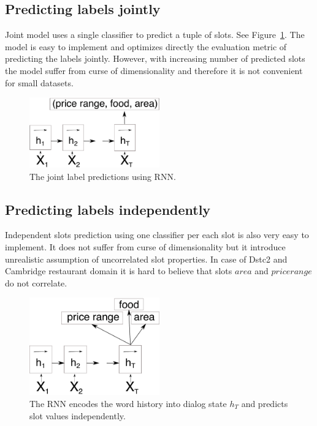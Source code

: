 \documentclass{itatnew}
\begin{document}
\subsection{Predicting labels jointly}
\label{sec:joint}
Joint model uses a single classifier to predict a tuple of slots. 
See Figure~\ref{fig:encjoint}.
The model is easy to implement and optimizes directly the evaluation metric of predicting the labels jointly.
However, with increasing number of predicted slots the model suffer from curse of dimensionality and therefore it is not convenient for small datasets.
\begin{figure}
\includegraphics[width=0.5\textwidth]{encoder_joint}
\caption{The joint label predictions using RNN.}
\label{fig:encjoint}
\end{figure}

\subsection{Predicting labels independently}
\label{sec:indep}
Independent slots prediction using one classifier per each slot is also very easy to implement.
It does not suffer from curse of dimensionality but it introduce unrealistic assumption of uncorrelated slot properties.
In case of Dstc2 and Cambridge restaurant domain it is hard to believe that slots $area$ and $price range$ do not correlate.
\begin{figure}
\includegraphics[width=0.5\textwidth]{encoder}
\caption{The RNN encodes the word history into dialog state $h_T$ and predicts slot values independently.}
\label{fig:encind}
\end{figure}
\end{document}
